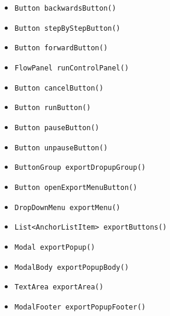 \begin{itemize}
\item \texttt{Button backwardsButton()}



\item \texttt{Button stepByStepButton()}



\item \texttt{Button forwardButton()}



\item \texttt{FlowPanel runControlPanel()}



\item \texttt{Button cancelButton()}



\item \texttt{Button runButton()}



\item \texttt{Button pauseButton()}



\item \texttt{Button unpauseButton()}



\item \texttt{ButtonGroup exportDropupGroup()}



\item \texttt{Button openExportMenuButton()}



\item \texttt{DropDownMenu exportMenu()}



\item \texttt{List<AnchorListItem> exportButtons()}



\item \texttt{Modal exportPopup()}



\item \texttt{ModalBody exportPopupBody()}



\item \texttt{TextArea exportArea()}



\item \texttt{ModalFooter exportPopupFooter()}




\end{itemize}
